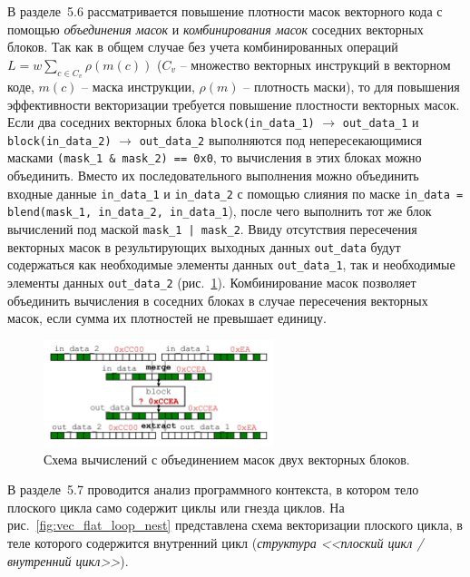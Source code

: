 \documentclass[a4paper,14pt]{extarticle}                     %
\theoremstyle{plain}                                         %
\begin{document}
В разделе~5.6 рассматривается повышение плотности масок векторного кода с помощью \textit{объединения масок} и \textit{комбинирования масок} соседних векторных блоков.
Так как в общем случае без учета комбинированных операций $L = w \sum_{c \in C_v}{\rho(m(c))}$ ($C_v$ -- множество векторных инструкций в векторном коде, $m(c)$ -- маска инструкции, $\rho(m)$ -- плотность маски), то для повышения эффективности векторизации требуется повышение плостности векторных масок.
Если два соседних векторных блока \texttt{block(in\_data\_1)} $\rightarrow$ \texttt{out\_data\_1} и \texttt{block(in\_data\_2)} $\rightarrow$ \texttt{out\_data\_2} выполняются под непересекающимися масками \texttt{(mask\_1 \& mask\_2) == 0x0}, то вычисления в этих блоках можно объединить.
Вместо их последовательного выполнения можно объединить входные данные \texttt{in\_data\_1} и \texttt{in\_data\_2} с помощью слияния по маске \texttt{in\_data = blend(mask\_1, in\_data\_2, in\_data\_1}), после чего выполнить тот же блок вычислений под маской \texttt{mask\_1 | mask\_2}.
Ввиду отсутствия пересечения векторных масок в результирующих выходных данных \texttt{out\_data} будут содержаться как необходимые элементы данных \texttt{out\_data\_1}, так и необходимые элементы данных \texttt{out\_data\_2} (рис.~\ref{fig:vec_unite_masks}).
Комбинирование масок позволяет объединить вычисления в соседних блоках в случае пересечения векторных масок, если сумма их плотностей не превышает единицу.

\begin{figure}[ht]
\centering
\includegraphics[width=0.6\textwidth]{./fig/vec_masks_union_big.pdf}
\singlespacing
\caption{Схема вычислений с объединением масок двух векторных блоков.}
\label{fig:vec_unite_masks}
\end{figure}


В разделе~5.7 проводится анализ программного контекста, в котором тело плоского цикла само содержит циклы или гнезда циклов.
На рис.~\ref{fig:vec_flat_loop_nest} представлена схема векторизации плоского цикла, в теле которого содержится внутренний цикл (\textit{структура <<плоский цикл / внутренний цикл>>}).
\end{document}

